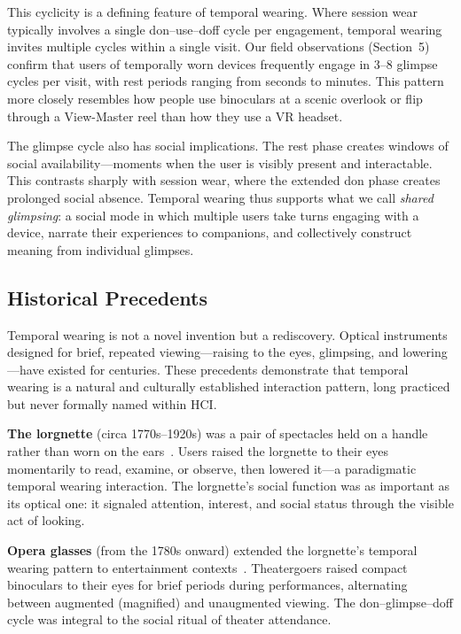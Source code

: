 This cyclicity is a defining feature of temporal wearing. Where session wear typically involves a single don--use--doff cycle per engagement, temporal wearing invites multiple cycles within a single visit. Our field observations (Section~5) confirm that users of temporally worn devices frequently engage in 3--8 glimpse cycles per visit, with rest periods ranging from seconds to minutes. This pattern more closely resembles how people use binoculars at a scenic overlook or flip through a View-Master reel than how they use a VR headset.

The glimpse cycle also has social implications. The rest phase creates windows of social availability---moments when the user is visibly present and interactable. This contrasts sharply with session wear, where the extended don phase creates prolonged social absence. Temporal wearing thus supports what we call \textit{shared glimpsing}: a social mode in which multiple users take turns engaging with a device, narrate their experiences to companions, and collectively construct meaning from individual glimpses.


\subsection{Historical Precedents}

Temporal wearing is not a novel invention but a rediscovery. Optical instruments designed for brief, repeated viewing---raising to the eyes, glimpsing, and lowering---have existed for centuries. These precedents demonstrate that temporal wearing is a natural and culturally established interaction pattern, long practiced but never formally named within HCI.

\textbf{The lorgnette} (circa 1770s--1920s) was a pair of spectacles held on a handle rather than worn on the ears~\cite{rosenthal1996spectacles}. Users raised the lorgnette to their eyes momentarily to read, examine, or observe, then lowered it---a paradigmatic temporal wearing interaction. The lorgnette's social function was as important as its optical one: it signaled attention, interest, and social status through the visible act of looking.

\textbf{Opera glasses} (from the 1780s onward) extended the lorgnette's temporal wearing pattern to entertainment contexts~\cite{ilardi2007renaissance}. Theatergoers raised compact binoculars to their eyes for brief periods during performances, alternating between augmented (magnified) and unaugmented viewing. The don--glimpse--doff cycle was integral to the social ritual of theater attendance.

